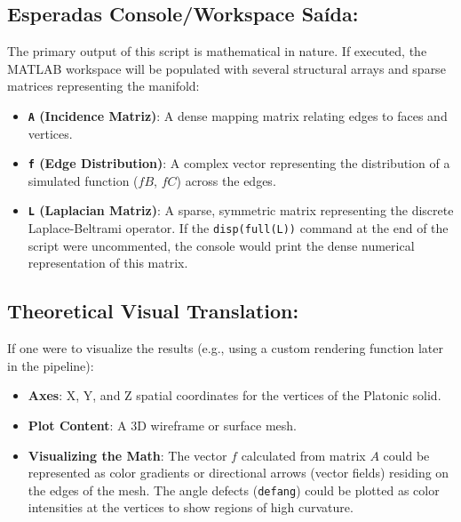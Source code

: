\subsection*{Esperadas Console/Workspace Saída:}
The primary output of this script is mathematical in nature. If executed, the MATLAB workspace will be populated with several structural arrays and sparse matrices representing the manifold:
\begin{itemize}
    \item \textbf{\texttt{A} (Incidence Matriz)}: A dense mapping matrix relating edges to faces and vertices.
    \item \textbf{\texttt{f} (Edge Distribution)}: A complex vector representing the distribution of a simulated function ($fB$, $fC$) across the edges.
    \item \textbf{\texttt{L} (Laplacian Matriz)}: A sparse, symmetric matrix representing the discrete Laplace-Beltrami operator. If the \texttt{disp(full(L))} command at the end of the script were uncommented, the console would print the dense numerical representation of this matrix.
\end{itemize}

\subsection*{Theoretical Visual Translation:}
If one were to visualize the results (e.g., using a custom rendering function later in the pipeline):
\begin{itemize}
    \item \textbf{Axes}: X, Y, and Z spatial coordinates for the vertices of the Platonic solid.
    \item \textbf{Plot Content}: A 3D wireframe or surface mesh.
    \item \textbf{Visualizing the Math}: The vector $f$ calculated from matrix $A$ could be represented as color gradients or directional arrows (vector fields) residing on the edges of the mesh. The angle defects (\texttt{defang}) could be plotted as color intensities at the vertices to show regions of high curvature.
\end{itemize}
